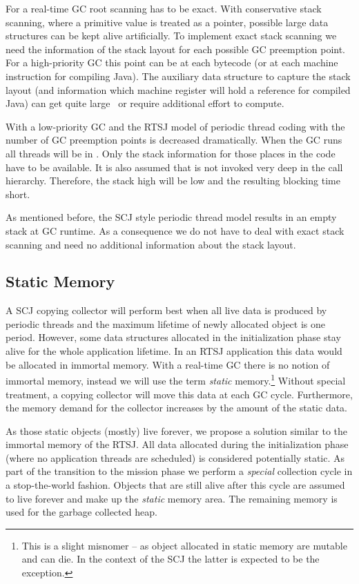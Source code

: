 For a real-time GC root scanning has to be exact. With conservative
stack scanning, where a primitive value is treated as a pointer,
possible large data structures can be kept alive artificially. To
implement exact stack scanning we need the information of the stack
layout for each possible GC preemption point. For a high-priority GC
this point can be at each bytecode (or at each machine instruction
for compiling Java). The auxiliary data structure to capture the
stack layout (and information which machine register will hold a
reference for compiled Java) can get quite large~\cite{jop:gcroots}
or require additional effort to compute.

With a low-priority GC and the RTSJ model of periodic thread coding
with  the number of GC preemption points is decreased
dramatically. When the GC runs all threads will be in .
Only the stack information for those places in the code have to be
available. It is also assumed that  is not invoked very
deep in the call hierarchy. Therefore, the stack high will be low
and the resulting blocking time short.

As mentioned before, the SCJ style periodic thread model results in
an empty stack at GC runtime. As a consequence we do not have to
deal with exact stack scanning and need no additional information
about the stack layout.

\subsection{Static Memory} \label{sec:static:mem}

A SCJ copying collector will perform best when all live data is
produced by periodic threads and the maximum lifetime of newly
allocated object is one period.  However, some data structures
allocated in the initialization phase stay alive for the whole
application lifetime.  In an RTSJ application this data would be
allocated in immortal memory.  With a real-time GC there is no
notion of {immortal} memory, instead we will use the term
\emph{static} memory.\footnote{This is a slight misnomer -- as
object allocated in static memory are mutable and can die. In the
context of the SCJ the latter is expected to be the exception.}
Without special treatment, a copying collector will move this data
at each GC cycle. Furthermore, the memory demand for the collector
increases by the amount of the static data.

As those static objects (mostly) live {forever}, we propose a solution
similar to the immortal memory of the RTSJ.  All data allocated during the
initialization phase (where no application threads are scheduled) is
considered potentially static. As part of the transition to the mission
phase we perform a \emph{special} collection cycle in a stop-the-world
fashion. Objects that are still alive after this cycle are assumed to live
forever and make up the \emph{static} memory area. The remaining memory is
used for the garbage collected heap.

